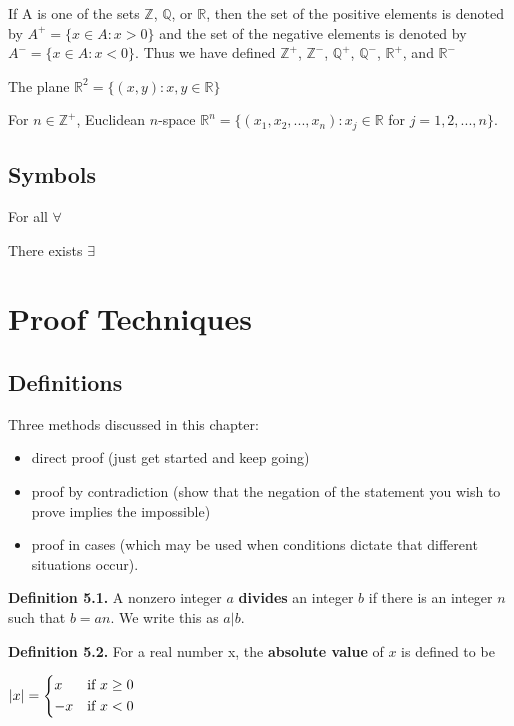 \documentclass{article}
\begin{document}
If A is one of the sets $\mathbb{Z}$, $\mathbb{Q}$, or $\mathbb{R}$, then the set of the positive elements is denoted by $A^+ = \{x \in A : x > 0 \}$ and the set of the negative elements is denoted by $A^- = \{x \in A : x < 0 \}$. Thus we have defined $\mathbb{Z}^+$, $\mathbb{Z}^-$, $\mathbb{Q}^+$, $\mathbb{Q}^-$, $\mathbb{R}^+$, and $\mathbb{R}^-$

The plane $\mathbb{R}^2 = \{(x,y) : x,y \in \mathbb{R} \}$

For $n \in \mathbb{Z}^+$, Euclidean $n$-space 
	$\mathbb{R}^n = \{(x_{1},x_{2},...,x_{n}) : x_{j} \in \mathbb{R}$ for $j=1,2,...,n \}$.
	
\subsection{Symbols}
For all $\forall$

There exists $\exists$

\section{Proof Techniques}
\subsection{Definitions}
Three methods discussed in this chapter:
\begin{itemize}
	\item direct proof (just get started and keep going)
	\item proof by contradiction (show that the negation of the statement you wish to prove implies the impossible)
	\item proof in cases (which may be used when conditions dictate that different situations occur).
\end{itemize}

\textbf{Definition 5.1.} A nonzero integer $a$ \textbf{divides} an integer $b$ if there is an integer $n$ such that $b = an$. We write this as $a|b$.

\textbf{Definition 5.2.} For a real number x, the \textbf{absolute value} of $x$ is defined to be

\begin{center}
	\begin{math}
		|x| =
			\begin{cases*}
				 x & if $x \geq 0$ \\
				-x & if $x < 0$
			\end{cases*}
	\end{math}
\end{center}
\end{document}
